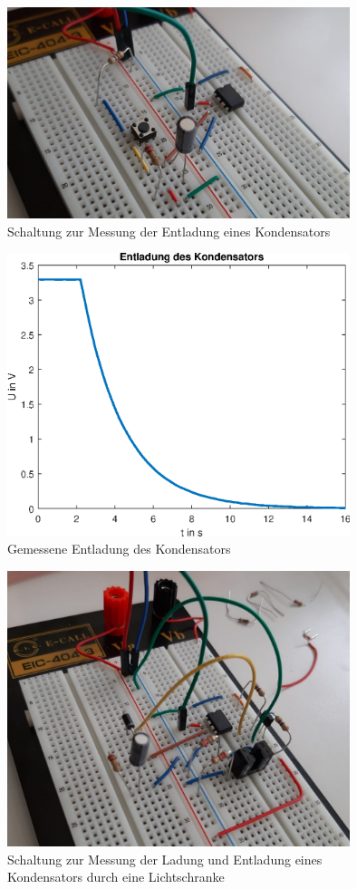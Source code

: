 \begin{figure}[htb]
    \includegraphics[width=10cm]{./res/Kondensator_Entladung}
    \caption{Schaltung zur Messung der Entladung eines Kondensators}
    \label{fig:KondensatorEntladung}
\end{figure}

\newpage

\begin{figure}[htb]
    \includegraphics[width=10cm]{./res/Kondensator_Entladung_Messung}
    \caption{Gemessene Entladung des Kondensators}
    \label{fig:KondensatorEntladungMess}
\end{figure}

\begin{figure}[htb]
    \includegraphics[width=10cm]{./res/Kondensator_Lichtschranke_1}
    \caption{Schaltung zur Messung der Ladung und Entladung eines Kondensators durch eine Lichtschranke}
    \label{fig:KondensatorLadungLichtschranke}
\end{figure}


